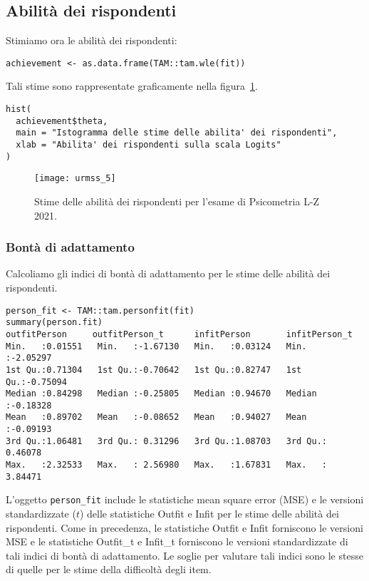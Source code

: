 \subsection{Abilità dei rispondenti}

Stimiamo ora le abilità dei rispondenti:

\begin{lstlisting} 
achievement <- as.data.frame(TAM::tam.wle(fit))
\end{lstlisting} 

\noindent
Tali stime sono rappresentate graficamente nella figura~\ref{fig:urmss_5}.

\begin{lstlisting} 
hist(
  achievement$theta, 
  main = "Istogramma delle stime delle abilita' dei rispondenti",
  xlab = "Abilita' dei rispondenti sulla scala Logits"
) 
\end{lstlisting} 

\begin{figure}[h!]
  \begin{center}
    \texttt{[image: urmss\_5]}
    \caption{Stime delle abilità dei rispondenti per l'esame di Psicometria L-Z 2021.}
    \label{fig:urmss_5}
  \end{center}
\end{figure}

\subsubsection{Bontà di adattamento}

Calcoliamo gli indici di bontà di adattamento per le stime delle abilità dei rispondenti.

\begin{lstlisting} 
person_fit <- TAM::tam.personfit(fit)
summary(person.fit)
outfitPerson     outfitPerson_t      infitPerson       infitPerson_t     
Min.   :0.01551   Min.   :-1.67130   Min.   :0.03124   Min.   :-2.05297  
1st Qu.:0.71304   1st Qu.:-0.70642   1st Qu.:0.82747   1st Qu.:-0.75094  
Median :0.84298   Median :-0.25805   Median :0.94670   Median :-0.18328  
Mean   :0.89702   Mean   :-0.08652   Mean   :0.94027   Mean   :-0.09193  
3rd Qu.:1.06481   3rd Qu.: 0.31296   3rd Qu.:1.08703   3rd Qu.: 0.46078  
Max.   :2.32533   Max.   : 2.56980   Max.   :1.67831   Max.   : 3.84471  
\end{lstlisting} 

L'oggetto \texttt{person\_fit} include le statistiche mean square error (MSE) e le versioni standardizzate ($t$) delle statistiche Outfit e Infit per le stime delle abilità dei rispondenti. 
Come in precedenza, le statistiche Outfit e Infit forniscono le versioni MSE e le statistiche Outfit\_t e Infit\_t forniscono le versioni standardizzate di tali indici di bontà di adattamento. 
Le soglie per valutare tali indici sono le stesse di quelle per le stime della difficoltà degli item.

